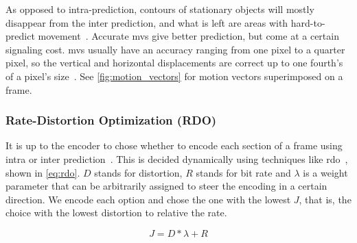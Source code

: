 

As opposed to intra-prediction, contours of stationary objects will mostly disappear from the inter prediction, and what is left are areas with hard-to-predict movement~\cite{Vcodex_HEVC_Walkthrough}. Accurate \glspl{mv} give better prediction, but come at a certain signaling cost. \Glspl{mv} usually have an accuracy ranging from one pixel to a quarter pixel, so the vertical and horizontal displacements are correct up to one fourth's of a pixel's size~\cite{Wien_Coding_Tools,Flierl}. See \cref{fig:motion_vectors} for motion vectors superimposed on a frame.

\subsubsection{Rate-Distortion Optimization (RDO)}
\label{subsec:rdo}
It is up to the encoder to chose whether to encode each section of a frame using intra or inter prediction~\cite{Wien_Coding_Tools}. This is decided dynamically using techniques like \gls{rdo}~\cite{Sullivan}, shown in \cref{eq:rdo}. $D$ stands for distortion, $R$ stands for bit rate and $\lambda$ is a weight parameter that can be arbitrarily assigned to steer the encoding in a certain direction. We encode each option and chose the one with the lowest $J$, that is, the choice with the lowest distortion to relative the rate.

\begin{equation}
\label{eq:rdo}
J = D * \lambda + R
\end{equation}

